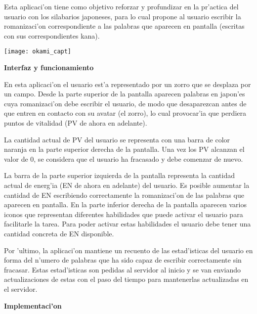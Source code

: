 Esta aplicaci'on tiene como objetivo reforzar y profundizar en la pr'actica del usuario con los silabarios japoneses,
para lo cual propone al usuario escribir la romanizaci'on correspondiente a las palabras que aparecen en pantalla
(escritas con sus correspondientes kana).

\begin{center}
\texttt{[image: okami\_capt]}
\end{center}

\textbf{Interfaz y funcionamiento}

En esta aplicaci'on el usuario est'a representado por un zorro que se desplaza por un campo. Desde la parte superior
de la pantalla aparecen palabras en japon'es cuya romanizaci'on debe escribir el usuario, de modo que desaparezcan
antes de que entren en contacto con su avatar (el zorro), lo cual provocar'ia que perdiera puntos de vitalidad (PV
de ahora en adelante).

La cantidad actual de PV del usuario se representa con una barra de color naranja en la parte superior derecha de la
pantalla. Una vez los PV alcanzan el valor de 0, se considera que el usuario ha fracasado y debe comenzar de nuevo.

La barra de la parte superior izquierda de la pantalla representa la cantidad actual de energ'ia (EN de ahora en 
adelante) del usuario. Es posible aumentar la cantidad de EN escribiendo correctamente la romanizaci'on de las 
palabras que aparecen en pantalla.
En la parte inferior derecha de la pantalla aparecen varios iconos que representan diferentes habilidades que puede
activar el usuario para facilitarle la tarea. Para poder activar estas habilidades el usuario debe tener una cantidad
concreta de EN disponible.

Por 'ultimo, la aplicaci'on mantiene un recuento de las estad'isticas del usuario en forma del n'umero de palabras
que ha sido capaz de escribir correctamente sin fracasar. Estas estad'isticas son pedidas al servidor al inicio y se
van enviando actualizaciones de estas con el paso del tiempo para mantenerlas actualizadas en el servidor.

\textbf{Implementaci'on}

